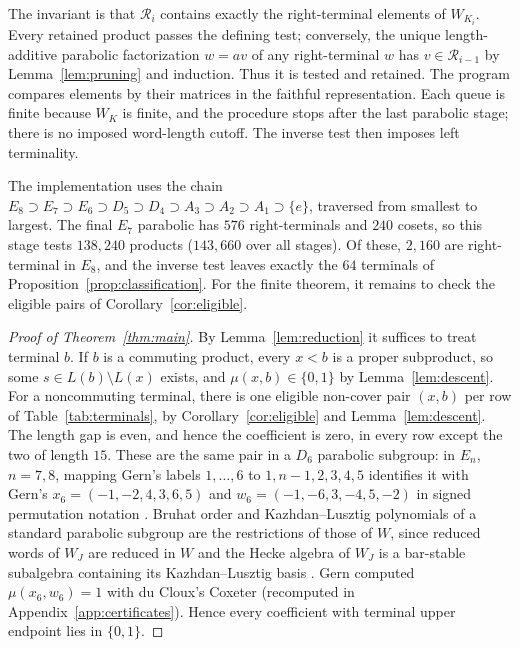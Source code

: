 \documentclass[10pt]{article}
\theoremstyle{remark}
\begin{document}
The invariant is that $\mathcal R_i$ contains exactly the right-terminal
elements of $W_{K_i}$. Every retained product passes the defining test;
conversely, the unique length-additive parabolic factorization $w=av$
of any right-terminal $w$ has $v\in\mathcal R_{i-1}$ by
Lemma~\ref{lem:pruning} and induction. Thus it is tested and retained.
The program compares elements by their matrices in the faithful
representation. Each queue is finite
because $W_K$ is finite, and the procedure stops after the last parabolic
stage; there is no imposed word-length cutoff. The inverse test then
imposes left terminality.

The implementation uses the chain
$E_8\supset E_7\supset E_6\supset D_5\supset D_4\supset A_3\supset
A_2\supset A_1\supset\{e\}$, traversed from smallest to largest.
The final $E_7$ parabolic
has $576$ right-terminals and $240$ cosets, so this stage tests
$138{,}240$ products ($143{,}660$ over all stages). Of these, $2{,}160$
are right-terminal in $E_8$, and the inverse test leaves exactly the $64$
terminals of Proposition~\ref{prop:classification}. For the finite
theorem, it remains to check the eligible pairs of
Corollary~\ref{cor:eligible}.

\begin{proof}[Proof of Theorem~\ref{thm:main}]
By Lemma~\ref{lem:reduction} it suffices to treat terminal $b$. If $b$ is
a commuting product, every $x<b$ is a proper subproduct, so some
$s\in L(b)\setminus L(x)$ exists, and
$\mu(x,b)\in\{0,1\}$ by Lemma~\ref{lem:descent}. For a noncommuting terminal,
there is one eligible non-cover pair $(x,b)$ per row of
Table~\ref{tab:terminals}, by Corollary~\ref{cor:eligible} and
Lemma~\ref{lem:descent}. The length gap is even, and hence the coefficient
is zero, in every row except the two of length $15$. These are the
same pair in a $D_6$ parabolic subgroup: in $E_n$, $n=7,8$, mapping Gern's
labels $1,\ldots,6$ to $1,n-1,2,3,4,5$ identifies it with Gern's
$x_6=(-1,-2,4,3,6,5)$ and $w_6=(-1,-6,3,-4,5,-2)$ in signed permutation
notation \cite[Example~1.1.6]{Gern}. Bruhat order and Kazhdan--Lusztig
polynomials of a standard parabolic subgroup are the restrictions of those
of $W$, since
reduced words of $W_J$ are reduced in $W$ and the Hecke algebra of $W_J$ is
a bar-stable subalgebra containing its Kazhdan--Lusztig basis
\cite[\S9.6 and Lemma~9.10(c),(d), with $z=e$]{LusztigUP}. Gern computed $\mu(x_6,w_6)=1$ with du
Cloux's \textsf{Coxeter} \cite[Lemma~4.5.5]{Gern} (recomputed in
Appendix~\ref{app:certificates}). Hence every coefficient with terminal
upper endpoint lies in $\{0,1\}$.
\end{proof}
\end{document}

